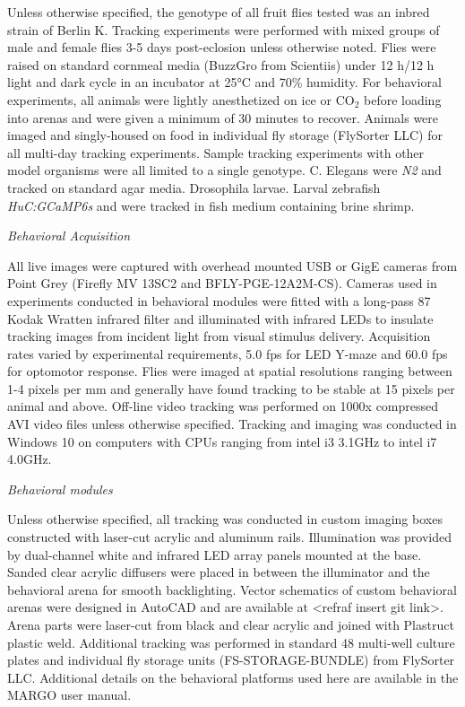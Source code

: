 \documentclass[10pt]{article}
\begin{document}
\begin{multicols}{2}
Unless otherwise specified, the genotype of all fruit flies tested was an inbred strain of  Berlin K. Tracking experiments were performed with mixed groups of male and female flies 3-5 days post-eclosion unless otherwise noted.  Flies were raised on standard cornmeal media (BuzzGro from Scientiis) under 12 h/12 h light and dark cycle in an incubator at 25°C and 70\% humidity. For behavioral experiments, all animals were lightly anesthetized on ice or CO$_2$ before loading into arenas and were given a minimum of 30 minutes to recover. Animals were imaged and singly-housed on food in individual fly storage (FlySorter LLC) for all multi-day tracking experiments. Sample tracking experiments with other model organisms were all limited to a single genotype. C. Elegans were \textit{N2} and tracked on standard agar media. Drosophila larvae. Larval zebrafish \textit{HuC:GCaMP6s} and were tracked in fish medium containing brine shrimp.

\vspace*{0.5cm}
\noindent\textit{Behavioral Acquisition}
\vspace*{0.3cm}

All live images were captured with overhead mounted USB or GigE cameras from Point Grey (Firefly MV 13SC2 and BFLY-PGE-12A2M-CS). Cameras used in experiments conducted in behavioral modules were fitted with a long-pass 87 Kodak Wratten infrared filter and illuminated with infrared LEDs to insulate tracking images from incident light from visual stimulus delivery. Acquisition rates varied by experimental requirements, 5.0 fps for LED Y-maze and 60.0 fps for optomotor response. Flies were imaged at spatial resolutions ranging between 1-4 pixels per mm and generally have found tracking to be stable at 15 pixels per animal and above.  Off-line video tracking was performed on 1000x compressed AVI video files unless otherwise specified. Tracking and imaging was conducted in Windows 10 on computers with CPUs ranging from intel i3 3.1GHz to intel i7 4.0GHz. 

\vspace*{0.5cm}
\noindent\textit{Behavioral modules}
\vspace*{0.3cm}

Unless otherwise specified, all tracking was conducted in custom imaging boxes constructed with laser-cut acrylic and aluminum rails. Illumination was provided by dual-channel white and infrared LED array panels mounted at the base. Sanded clear acrylic diffusers were placed in between the illuminator and the behavioral arena for smooth backlighting. Vector schematics of custom behavioral arenas were designed in AutoCAD and are available at <refraf insert git link>. Arena parts were laser-cut from black and clear acrylic and joined with Plastruct plastic weld. Additional tracking was performed in standard 48 multi-well culture plates and individual fly storage units (FS-STORAGE-BUNDLE) from FlySorter LLC. Additional details on the behavioral platforms used here are available in the MARGO user manual.


\end{multicols}
\end{document}
